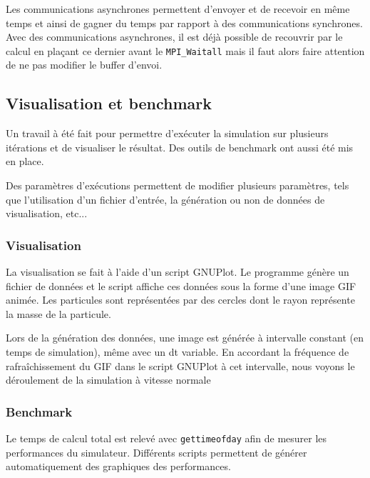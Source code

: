 Les communications asynchrones permettent d'envoyer et de recevoir en même temps et ainsi de gagner du temps par rapport à des communications synchrones. Avec des communications asynchrones, il est déjà possible de recouvrir par le calcul en plaçant ce dernier avant le \texttt{MPI\_Waitall} mais il faut alors faire attention de ne pas modifier le buffer d'envoi.




\subsection{Visualisation et benchmark}

Un travail à été fait pour permettre d'exécuter la simulation sur plusieurs itérations et de visualiser le résultat. Des outils de benchmark ont aussi été mis en place.

Des paramètres d'exécutions permettent de modifier plusieurs paramètres, tels que l'utilisation d'un fichier d'entrée, la génération ou non de données de visualisation, etc...

\subsubsection{Visualisation}

La visualisation se fait à l'aide d'un script GNUPlot. Le programme génère un fichier de données et le script affiche ces données sous la forme d'une image GIF animée. Les particules sont représentées par des cercles dont le rayon représente la masse de la particule.

Lors de la génération des données, une image est générée à intervalle constant (en temps de simulation), même avec un dt variable. En accordant la fréquence de rafraîchissement du GIF dans le script GNUPlot à cet intervalle, nous voyons le déroulement de la simulation à vitesse normale

\subsubsection{Benchmark}

Le temps de calcul total est relevé avec \texttt{gettimeofday} afin de mesurer les performances du simulateur. Différents scripts permettent de générer automatiquement des graphiques des performances.
